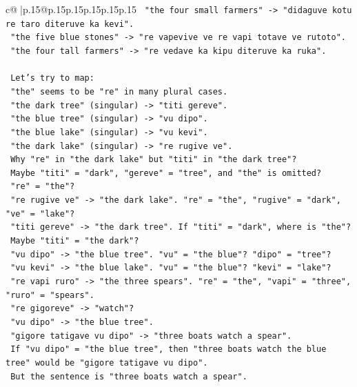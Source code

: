 \documentclass{article}
\begin{document}
{\begin{supertabular}{c@{$\;$}|p{.15\linewidth}@{}p{.15\linewidth}p{.15\linewidth}p{.15\linewidth}p{.15\linewidth}p{.15\linewidth}}
{{{\texttt{    "the four small farmers" {-}> "didaguve kotu re taro diteruve ka kevi".} \\
\texttt{    "the five blue stones" {-}> "re vapevive ve re vapi totave ve rutoto".} \\
\texttt{    "the four tall farmers" {-}> "re vedave ka kipu diteruve ka ruka".} \\
\\ 
\texttt{    Let's try to map:} \\
\texttt{    "the" seems to be "re" in many plural cases.} \\
\texttt{    "the dark tree" (singular) {-}> "titi gereve".} \\
\texttt{    "the blue tree" (singular) {-}> "vu dipo".} \\
\texttt{    "the blue lake" (singular) {-}> "vu kevi".} \\
\texttt{    "the dark lake" (singular) {-}> "re rugive ve".} \\
\texttt{    Why "re" in "the dark lake" but "titi" in "the dark tree"?} \\
\texttt{    Maybe "titi" = "dark", "gereve" = "tree", and "the" is omitted?} \\
\texttt{    "re" = "the"?} \\
\texttt{    "re rugive ve" {-}> "the dark lake". "re" = "the", "rugive" = "dark", "ve" = "lake"?} \\
\texttt{    "titi gereve" {-}> "the dark tree". If "titi" = "dark", where is "the"?} \\
\texttt{    Maybe "titi" = "the dark"?} \\
\texttt{    "vu dipo" {-}> "the blue tree". "vu" = "the blue"? "dipo" = "tree"?} \\
\texttt{    "vu kevi" {-}> "the blue lake". "vu" = "the blue"? "kevi" = "lake"?} \\
\texttt{    "re vapi ruro" {-}> "the three spears". "re" = "the", "vapi" = "three", "ruro" = "spears".} \\
\texttt{    "re gigoreve" {-}> "watch"?} \\
\texttt{    "vu dipo" {-}> "the blue tree".} \\
\texttt{    "gigore tatigave vu dipo" {-}> "three boats watch a spear".} \\
\texttt{    If "vu dipo" = "the blue tree", then "three boats watch the blue tree" would be "gigore tatigave vu dipo".} \\
\texttt{    But the sentence is "three boats watch a spear".} \\
}}}
\end{supertabular}}
\end{document}
